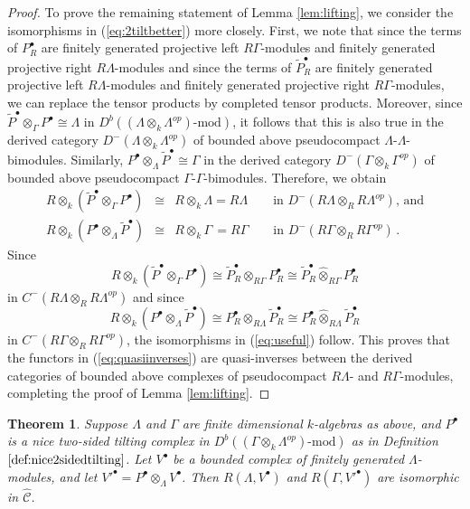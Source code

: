 \documentclass{amsart}
\theoremstyle{plain}
\newtheorem{thm}{Theorem}[subsection]
\theoremstyle{definition}
\theoremstyle{remark}
\begin{document}
\begin{proof}
To prove the remaining statement of Lemma \ref{lem:lifting}, we consider the isomorphisms
in (\ref{eq:2tiltbetter}) more closely. First, we note that since the terms of 
$P_R^\bullet$ are finitely generated projective left $R\Gamma$-modules and finitely generated
projective right $R\Lambda$-modules and since the terms of $\widetilde{P}_R^\bullet$ are finitely 
generated projective left $R\Lambda$-modules and finitely generated
projective right $R\Gamma$-modules, we can replace the tensor products by completed tensor
products. Moreover, since $\widetilde{P}^\bullet \otimes_{\Gamma}P^\bullet\cong  \Lambda$
in $D^b((\Lambda\otimes_k \Lambda^{op})\mbox{-mod})$, it follows that this is also true
in the derived category $D^-(\Lambda\otimes_k \Lambda^{op})$ of bounded above
pseudocompact $\Lambda$-$\Lambda$-bimodules. Similarly, 
$P^\bullet \otimes_{\Lambda}\widetilde{P}^\bullet\cong  \Gamma$ in the derived category 
$D^-(\Gamma\otimes_k \Gamma^{op})$ of bounded above
pseudocompact $\Gamma$-$\Gamma$-bimodules.  Therefore, we obtain
\begin{eqnarray}
\label{eq:oyoyoy} 
R\otimes_k(\widetilde{P}^\bullet \otimes_{\Gamma}P^\bullet )
&\cong&  R\otimes_k\Lambda=R\Lambda \qquad
\mbox{in $D^-(R\Lambda\otimes_R R\Lambda^{op})$, and}\\
R\otimes_k(P^\bullet \otimes_{\Lambda}\widetilde{P}^\bullet)
&\cong& R\otimes_k\Gamma\,=R\Gamma \qquad
\mbox{in $D^-(R\Gamma\otimes_R R\Gamma^{op})\,.$} \nonumber
\end{eqnarray}
Since 
$$R\otimes_k(\widetilde{P}^\bullet \otimes_{\Gamma}P^\bullet )
\cong \widetilde{P}_R^\bullet \otimes_{R\Gamma}P_R^\bullet
\cong \widetilde{P}_R^\bullet \hat{\otimes}_{R\Gamma}P_R^\bullet$$ 
in $C^-(R\Lambda\otimes_R R\Lambda^{op})$
and since 
$$R\otimes_k(P^\bullet \otimes_{\Lambda}\widetilde{P}^\bullet)
\cong P_R^\bullet \otimes_{R\Lambda}\widetilde{P}_R^\bullet
\cong P_R^\bullet \hat{\otimes}_{R\Lambda}\widetilde{P}_R^\bullet$$
in $C^-(R\Gamma\otimes_R R\Gamma^{op})$, 
the isomorphisms in (\ref{eq:useful}) follow.
This proves that the functors in (\ref{eq:quasiinverses}) are quasi-inverses
between the derived categories of bounded above complexes of pseudocompact 
$R\Lambda$- and $R\Gamma$-modules, completing the proof of Lemma \ref{lem:lifting}.
\end{proof}

\begin{thm}
\label{thm:deformations}
Suppose $\Lambda$ and $\Gamma$ are finite dimensional $k$-algebras as above,
and $P^\bullet$ is a nice two-sided tilting complex in 
$D^b((\Gamma\otimes_k\Lambda^{op})\mbox{-$\mathrm{mod}$})$
as in Definition $\ref{def:nice2sidedtilting}$. 
Let $V^\bullet$ be a bounded complex
of finitely generated $\Lambda$-modules, and let ${V'}^\bullet = P^\bullet\otimes_\Lambda
V^\bullet$. Then $R(\Lambda,V^\bullet)$ and $R(\Gamma,{V'}^\bullet)$ are isomorphic
in $\hat{\mathcal{C}}$.
\end{thm}
\end{document}
